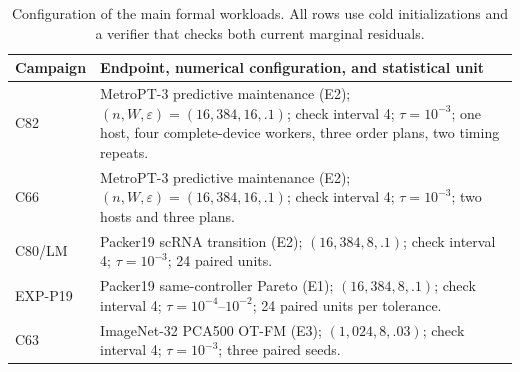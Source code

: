 \begin{table}[t]
\centering
\caption{Configuration of the main formal workloads. All rows use cold
initializations and a verifier that checks both current marginal residuals.}
\label{tab:workload-configs}
\scriptsize
\setlength{\tabcolsep}{3pt}
\begin{tabular}{@{}p{}p{}@{}}
\toprule
Campaign & Endpoint, numerical configuration, and statistical unit \\
\midrule
C82 & MetroPT-3 predictive maintenance (E2); $(n,W,\varepsilon)=(16{,}384,16,.1)$; check interval 4; $\tau=10^{-3}$; one host, four complete-device workers, three order plans, two timing repeats. \\
C66 & MetroPT-3 predictive maintenance (E2); $(n,W,\varepsilon)=(16{,}384,16,.1)$; check interval 4; $\tau=10^{-3}$; two hosts and three plans. \\
C80/LM & Packer19 scRNA transition (E2); $(16{,}384,8,.1)$; check interval 4; $\tau=10^{-3}$; 24 paired units. \\
EXP-P19 & Packer19 same-controller Pareto (E1); $(16{,}384,8,.1)$; check interval 4; $\tau=10^{-4}\text{--}10^{-2}$; 24 paired units per tolerance. \\
C63 & ImageNet-32 PCA500 OT-FM (E3); $(1{,}024,8,.03)$; check interval 4; $\tau=10^{-3}$; three paired seeds. \\
\bottomrule
\end{tabular}
\end{table}

